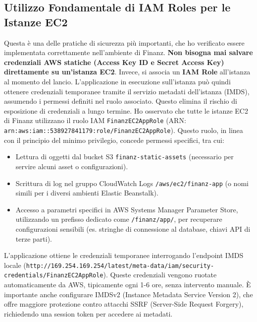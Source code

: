 \subsection{Utilizzo Fondamentale di IAM Roles per le Istanze EC2}
\label{subsec:iam-roles-ec2_cap2}
Questa è una delle pratiche di sicurezza più importanti, che ho verificato essere implementata correttamente nell'ambiente di Finanz. \textbf{Non bisogna mai salvare credenziali AWS statiche (Access Key ID e Secret Access Key) direttamente su un'istanza EC2}. Invece, si associa un \textbf{IAM Role} all'istanza al momento del lancio. L'applicazione in esecuzione sull'istanza può quindi ottenere credenziali temporanee tramite il servizio metadati dell'istanza (IMDS), assumendo i permessi definiti nel ruolo associato. Questo elimina il rischio di esposizione di credenziali a lungo termine.
Ho osservato che tutte le istanze EC2 di Finanz utilizzano il ruolo IAM \texttt{FinanzEC2AppRole} (ARN: \texttt{arn:aws:iam::538927841179:role/FinanzEC2AppRole}). Questo ruolo, in linea con il principio del minimo privilegio, concede permessi specifici, tra cui:
\begin{itemize}
    \item Lettura di oggetti dal bucket S3 \texttt{finanz-static-assets} (necessario per servire alcuni asset o configurazioni).
    \item Scrittura di log nel gruppo CloudWatch Logs \texttt{/aws/ec2/finanz-app} (o nomi simili per i diversi ambienti Elastic Beanstalk).
    \item Accesso a parametri specifici in AWS Systems Manager Parameter Store, utilizzando un prefisso dedicato come \texttt{/finanz/app/}, per recuperare configurazioni sensibili (es. stringhe di connessione al database, chiavi API di terze parti).
\end{itemize}
L'applicazione ottiene le credenziali temporanee interrogando l'endpoint IMDS locale (\texttt{http://169.254.169.254/latest/meta-data/iam/security-credentials/FinanzEC2AppRole}). Queste credenziali vengono ruotate automaticamente da AWS, tipicamente ogni 1-6 ore, senza intervento manuale. È importante anche configurare IMDSv2 (Instance Metadata Service Version 2), che offre maggiore protezione contro attacchi SSRF (Server-Side Request Forgery), richiedendo una session token per accedere ai metadati.

